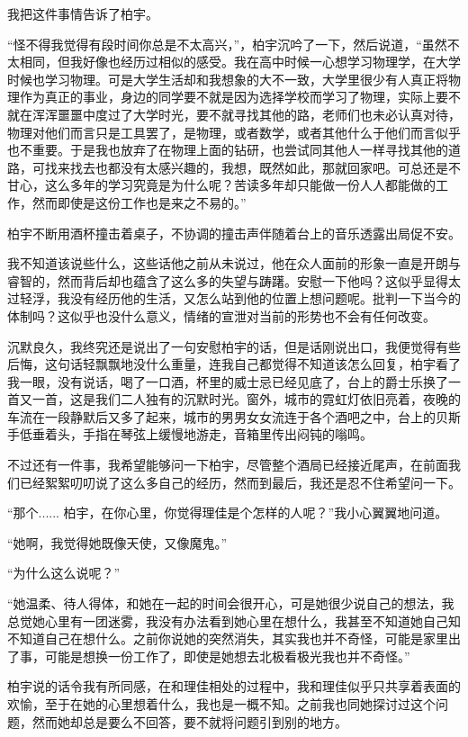 我把这件事情告诉了柏宇。

“怪不得我觉得有段时间你总是不太高兴，”，柏宇沉吟了一下，然后说道，“虽然不太相同，但我好像也经历过相似的感受。我在高中时候一心想学习物理学，在大学时候也学习物理。可是大学生活却和我想象的大不一致，大学里很少有人真正将物理作为真正的事业，身边的同学要不就是因为选择学校而学习了物理，实际上要不就在浑浑噩噩中度过了大学时光，要不就寻找其他的路，老师们也未必认真对待，物理对他们而言只是工具罢了，是物理，或者数学，或者其他什么于他们而言似乎也不重要。于是我也放弃了在物理上面的钻研，也尝试同其他人一样寻找其他的道路，可找来找去也都没有太感兴趣的，我想，既然如此，那就回家吧。可总还是不甘心，这么多年的学习究竟是为什么呢？苦读多年却只能做一份人人都能做的工作，然而即使是这份工作也是来之不易的。”

柏宇不断用酒杯撞击着桌子，不协调的撞击声伴随着台上的音乐透露出局促不安。

我不知道该说些什么，这些话他之前从未说过，他在众人面前的形象一直是开朗与睿智的，然而背后却也蕴含了这么多的失望与踌躇。安慰一下他吗？这似乎显得太过轻浮，我没有经历他的生活，又怎么站到他的位置上想问题呢。批判一下当今的体制吗？这似乎也没什么意义，情绪的宣泄对当前的形势也不会有任何改变。

沉默良久，我终究还是说出了一句安慰柏宇的话，但是话刚说出口，我便觉得有些后悔，这句话轻飘飘地没什么重量，连我自己都觉得不知道该怎么回复，柏宇看了我一眼，没有说话，喝了一口酒，杯里的威士忌已经见底了，台上的爵士乐换了一首又一首，这是我们二人独有的沉默时光。窗外，城市的霓虹灯依旧亮着，夜晚的车流在一段静默后又多了起来，城市的男男女女流连于各个酒吧之中，台上的贝斯手低垂着头，手指在琴弦上缓慢地游走，音箱里传出闷钝的嗡鸣。

不过还有一件事，我希望能够问一下柏宇，尽管整个酒局已经接近尾声，在前面我们已经絮絮叨叨说了这么多自己的经历，然而到最后，我还是忍不住希望问一下。

“那个...... 柏宇，在你心里，你觉得理佳是个怎样的人呢？”我小心翼翼地问道。

“她啊，我觉得她既像天使，又像魔鬼。”

“为什么这么说呢？”

“她温柔、待人得体，和她在一起的时间会很开心，可是她很少说自己的想法，我总觉她心里有一团迷雾，我没有办法看到她心里在想什么，我甚至不知道她自己知不知道自己在想什么。之前你说她的突然消失，其实我也并不奇怪，可能是家里出了事，可能是想换一份工作了，即使是她想去北极看极光我也并不奇怪。”

柏宇说的话令我有所同感，在和理佳相处的过程中，我和理佳似乎只共享着表面的欢愉，至于在她的心里想着什么，我也是一概不知。之前我也同她探讨过这个问题，然而她却总是要么不回答，要不就将问题引到别的地方。

